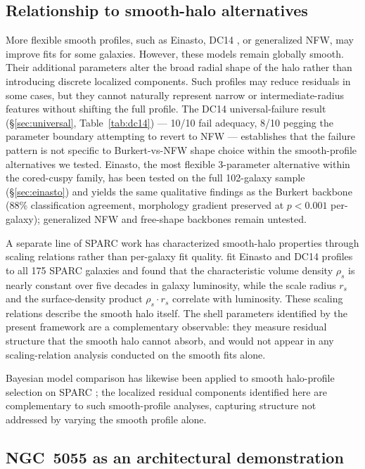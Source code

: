 \documentclass[linenumbers]{aastex701}
\begin{document}
\subsection{Relationship to smooth-halo alternatives}\label{sec:smoothalt}

More flexible smooth profiles, such as Einasto, DC14 \citep{DiCintio2014a,DiCintio2014b}, or generalized NFW, may improve fits for some galaxies. However, these models remain globally smooth. Their additional parameters alter the broad radial shape of the halo rather than introducing discrete localized components. Such profiles may reduce residuals in some cases, but they cannot naturally represent narrow or intermediate-radius features without shifting the full profile. The DC14 universal-failure result (\S\ref{sec:universal}, Table~\ref{tab:dc14}) --- 10/10 fail adequacy, 8/10 pegging the parameter boundary attempting to revert to NFW --- establishes that the failure pattern is not specific to Burkert-vs-NFW shape choice within the smooth-profile alternatives we tested. Einasto, the most flexible 3-parameter alternative within the cored-cuspy family, has been tested on the full 102-galaxy sample (\S\ref{sec:einasto}) and yields the same qualitative findings as the Burkert backbone (88\% classification agreement, morphology gradient preserved at $p < 0.001$ per-galaxy); generalized NFW and free-shape backbones remain untested.

A separate line of SPARC work has characterized smooth-halo properties through scaling relations rather than per-galaxy fit quality. \citet{Li2019} fit Einasto and DC14 profiles to all 175 SPARC galaxies and found that the characteristic volume density $\rho_s$ is nearly constant over five decades in galaxy luminosity, while the scale radius $r_s$ and the surface-density product $\rho_s \cdot r_s$ correlate with luminosity. These scaling relations describe the smooth halo itself. The shell parameters identified by the present framework are a complementary observable: they measure residual structure that the smooth halo cannot absorb, and would not appear in any scaling-relation analysis conducted on the smooth fits alone.

Bayesian model comparison has likewise been applied to smooth halo-profile selection on SPARC \citep{Khelashvili2023}; the localized residual components identified here are complementary to such smooth-profile analyses, capturing structure not addressed by varying the smooth profile alone.

\subsection{NGC~5055 as an architectural demonstration}\label{sec:ngc5055arch}
\end{document}
